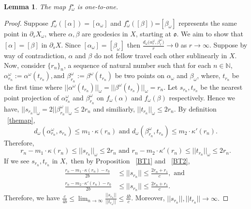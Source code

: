 \documentclass[12 pt]{amsart}
\newcommand{\gothic}{\mathfrak}
\newcommand{\go}{{\gothic o}}
\newtheorem{lemma}[theorem]{Lemma}
\theoremstyle{definition}
\theoremstyle{remark}
\begin{document}
\begin{lemma} \label{oneone}
    The map $f_\omega^{\star}$  is one-to-one.
\end{lemma}
\begin{proof}
Suppose $f_\omega^\star([\alpha])=[\alpha_\omega]$ and  $f_\omega^\star([\beta])$=$[\beta_{\omega}]$ represents the same point in $\partial_sX_\omega$, where $\alpha,\beta$ are  geodesics in $X$, starting at $\go$. We aim to show that $[\alpha]=[\beta]$ in $\partial_sX$. Since $ [\alpha_\omega]=[\beta_\omega]$ then $\frac{d_\omega\big(\alpha^{\omega}_r,\beta^\omega_r\big)}{r} \rightarrow 0$ as $r\rightarrow \infty$. Suppose by way of contradiction, $\alpha$ and $\beta$ do not fellow travel each other sublinearly in $X$.
Now, consider $\{r_n\}_n$, a sequence of natural number such that for each $n\in \mathbb{N}$,  $\alpha^\omega_{r_n}:=\alpha^\omega(t_{r_n}), \text{and } \beta^\omega_{r_n}:=\beta^\omega(t_{r_n})$ be two points on $\alpha_\omega$ and $\beta_\omega$, where, $t_{r_n}$ be the first time where $||\alpha^\omega(t_{r_n})||_\omega=||\beta^\omega(t_{r_n})||_\omega=r_n.$ Let $s_{r_n},t_{r_n}$ be the nearest point projection of $\alpha^\omega_{r_n}$ and $\beta^\omega_{r_n}$ on $f_\omega(\alpha)$ and $f_\omega(\beta)$ respectively. Hence we have, $||s_{r_n}||_\omega=2||\beta^\omega_{r_n}||_\omega \leq 2r_n$ and similiarly, $||t_{r_n}||_\omega\leq 2r_n.$
By definition ~\ref{themap}, \[d_\omega(\alpha^\omega_{r_n},s_{r_n}) \leq m_1 \cdot \kappa(r_n) \text{  and }d_\omega(\beta^\omega_{r_n},t_{r_n}) \leq m_2 \cdot \kappa'(r_n).\]
Therefore, \[r_n-m_1\cdot \kappa(r_n) \leq ||s_{r_n}||_\omega \leq 2r_n  \text{ and  } r_n-m_2\cdot \kappa'(r_n) \leq ||t_{r_n}||_\omega \leq 2r_n .\]
If we see $s_{r_n}, t_{r_n}$ in $X,$ then by Proposition ~\ref{BT1} and ~\ref{BT2}, \begin{align*}
\frac{r_n-m_1\cdot \kappa(r_n)-r_0}{2b} &\leq ||s_{r_n}|| \leq \frac{2r_n+r_1}{c}, \text{ and  } \\
 \frac{r_n-m_2\cdot \kappa'(r_n)-r_0}{2b} &\leq ||s_{r_n}|| \leq \frac{2r_n+r_1}{c}.
\end{align*}
Therefore, we have $\frac{c}{4b}\leq \lim_{n\to\infty}\frac{||s_{r_n}||}{||t_{r_n}||} \leq \frac{4b}{c}$. Moreover, $||s_{r_n}||,||t_{r_n}|| \to \infty.$




\end{proof}
\end{document}
